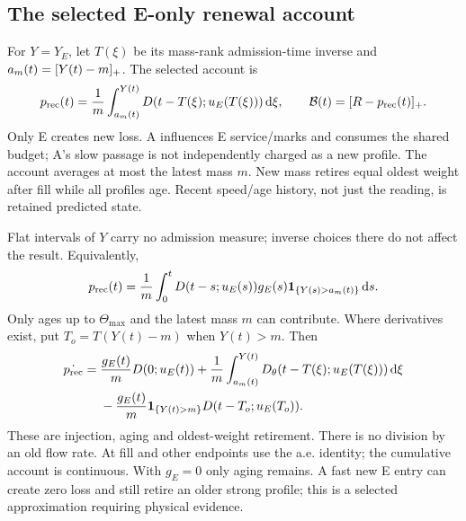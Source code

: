 \subsection{The selected E-only renewal account}
For $Y=Y_E$, let $T(\xi)$ be its mass-rank admission-time inverse and
$a_m(t)=[Y(t)-m]_+$. The selected account is
\begin{equation}
 p_{\mathrm{rec}}(t)=\frac1m\int_{a_m(t)}^{Y(t)}
 D(t-T(\xi);u_E(T(\xi)))\,\mathrm d\xi,\qquad
 \mathcal B(t)=[R-p_{\mathrm{rec}}(t)]_+. \label{eq:renewal}
\end{equation}
Only E creates new loss. A influences E service/marks and consumes the
shared budget; A's slow passage is not independently charged as a new
profile. The account averages at most the latest mass $m$. New mass
retires equal oldest weight after fill while all profiles age. Recent
speed/age history, not just the reading, is retained predicted state.

Flat intervals of $Y$ carry no admission measure; inverse choices there
do not affect the result. Equivalently,
\begin{equation}
 p_{\mathrm{rec}}(t)=\frac1m\int_0^tD(t-s;u_E(s))g_E(s)
             \mathbf1_{\{Y(s)>a_m(t)\}}\,\mathrm d s. \label{eq:renewaltime}
\end{equation}
Only ages up to $\Theta_{\max}$ and the latest mass $m$ can contribute.
Where derivatives exist, put $T_o=T(Y(t)-m)$ when $Y(t)>m$. Then
\begin{align}
 \dot{p_{\mathrm{rec}}}={}&\frac{g_E(t)}mD(0;u_E(t))
 +\frac1m\int_{a_m(t)}^{Y(t)}
 D_\theta(t-T(\xi);u_E(T(\xi)))\,\mathrm d\xi\nonumber\\
 &-\frac{g_E(t)}m\mathbf1_{\{Y(t)>m\}}
 D(t-T_o;u_E(T_o)). \label{eq:renewalupdate}
\end{align}
These are injection, aging and oldest-weight retirement. There is no
division by an old flow rate. At fill and other endpoints use the a.e.
identity; the cumulative account is continuous. With $g_E=0$ only aging
remains. A fast new E entry can create zero loss and still retire an older
strong profile; this is a selected approximation requiring physical evidence.
